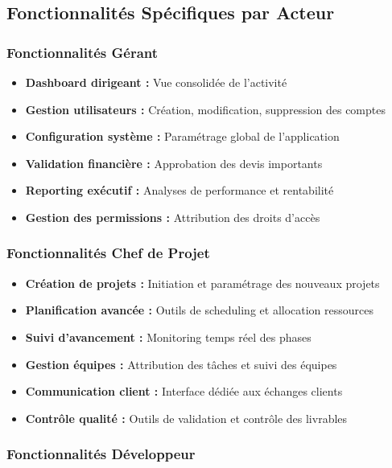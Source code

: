 \subsection{Fonctionnalités Spécifiques par Acteur}

\subsubsection{Fonctionnalités Gérant}

\begin{itemize}
    \item \textbf{Dashboard dirigeant :} Vue consolidée de l'activité
    \item \textbf{Gestion utilisateurs :} Création, modification, suppression des comptes
    \item \textbf{Configuration système :} Paramétrage global de l'application
    \item \textbf{Validation financière :} Approbation des devis importants
    \item \textbf{Reporting exécutif :} Analyses de performance et rentabilité
    \item \textbf{Gestion des permissions :} Attribution des droits d'accès
\end{itemize}

\subsubsection{Fonctionnalités Chef de Projet}

\begin{itemize}
    \item \textbf{Création de projets :} Initiation et paramétrage des nouveaux projets
    \item \textbf{Planification avancée :} Outils de scheduling et allocation ressources
    \item \textbf{Suivi d'avancement :} Monitoring temps réel des phases
    \item \textbf{Gestion équipes :} Attribution des tâches et suivi des équipes
    \item \textbf{Communication client :} Interface dédiée aux échanges clients
    \item \textbf{Contrôle qualité :} Outils de validation et contrôle des livrables
\end{itemize}

\subsubsection{Fonctionnalités Développeur}

